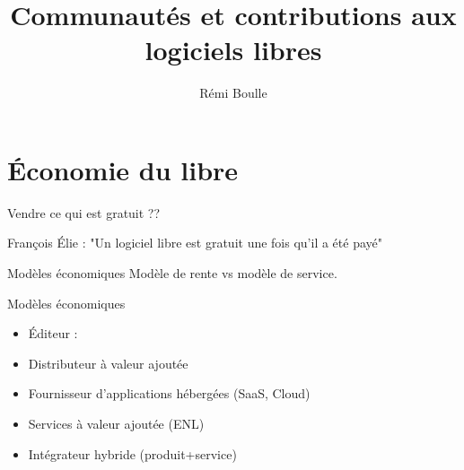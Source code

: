\documentclass{beamer}
\title[]{Communautés et contributions aux logiciels libres}
\author{Rémi Boulle}
\date{}
\institute{}
\begin{document}


\begin{frame}
  \titlepage
\end{frame}


\section{Économie du libre}

\begin{frame}{Vendre ce qui est gratuit ??}
  \begin{block}{François Élie :}
 "Un logiciel libre est gratuit une fois qu'il a été payé"
\end{block}

\begin{alertblock}{Modèles économiques}
  Modèle de rente vs modèle de service.
\end{alertblock}
\end{frame}

\begin{frame}{Modèles économiques}
  \begin{itemize}
  \item Éditeur : 
  \item Distributeur à valeur ajoutée  
  \item Fournisseur d'applications hébergées (SaaS, Cloud)  
  \item Services à valeur ajoutée (ENL)  
  \item Intégrateur hybride (produit+service)  
  \end{itemize}
  
\end{frame}
\end{document}
